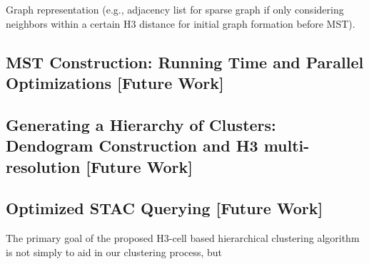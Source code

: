 \begin{multicols}{2}
Graph representation (e.g., adjacency list for sparse graph if only considering neighbors within a certain H3 distance for initial graph formation before MST).

\subsection{MST Construction: Running Time and Parallel Optimizations [Future Work]}


\subsection{Generating a Hierarchy of Clusters: Dendogram Construction and H3 multi-resolution [Future Work]}

\subsection{Optimized STAC Querying [Future Work]}
The primary goal of the proposed H3-cell based hierarchical clustering algorithm is not simply to aid in our clustering process, but




\end{multicols}
